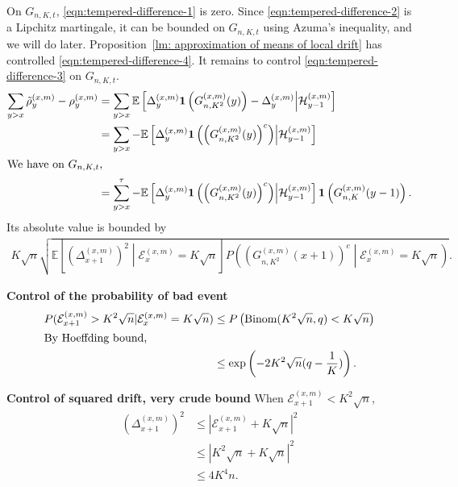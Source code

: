 \documentclass[twoside,12pt,a4paper]{article}
\numberwithin{equation}{section}
\begin{document}
On $G_{n, K, t}$, \eqref{eqn:tempered-difference-1} is zero. Since \eqref{eqn:tempered-difference-2} is a Lipchitz martingale, it can be bounded on $G_{n, K, t}$ using Azuma's inequality, and we will do later. Proposition~\ref{lm: approximation of means of local drift} has controlled \eqref{eqn:tempered-difference-4}. It remains to control \eqref{eqn:tempered-difference-3} on $G_{n, K, t}$. 
	\begin{align*}
		\sum_{y > x} \tilde\rho_y^{(x,m)} - \rho_y^{(x,m)}
		&= \sum_{y > x} \mathbb{E}\left[ \Delta_y^{(x,m)}\mathbf{1}\left( G_{n, K^2}^{(x,m)}(y) \right) - \Delta_{y}^{(x,m)} \middle| \mathcal{H}_{y-1}^{(x,m)}  \right]  \\
		&= \sum_{y > x} -\mathbb{E}\left[ \Delta_y^{(x,m)}\mathbf{1}\left( \left( G_{n, K^2}^{(x,m)}(y) \right) ^c \right) \middle| \mathcal{H}_{y-1}^{(x,m)}  \right]  \\
		\intertext{We have on $G_{n, K, t}$,}
		&= \sum_{y > x}^{\tau} -\mathbb{E}\left[ \Delta_y^{(x,m)}\mathbf{1}\left( \left( G_{n, K^2}^{(x,m)}(y) \right) ^c \right) \middle| \mathcal{H}_{y-1}^{(x,m)}  \right] \mathbf{1}\left(G_{n, K}^{(x,m)}(y-1)\right)
	.\end{align*}
Its absolute value is bounded by
\begin{align*}
	K \sqrt{n} \sqrt{
			\mathbb{E}\left[ (\Delta_{x+1}^{(x,m)})^2 \middle| \mathcal{E}_{x}^{(x,m)} = K \sqrt{n}  \right]
			P\left( \left( G^{(x,m)}_{n, K^2}(x+1) \right) ^{c} \middle| \mathcal{E}_{x}^{(x,m)} = K \sqrt{n}  \right) 
	}
.\end{align*}

\textbf{Control of the probability of bad event}
\begin{align*}
	P(\mathcal{E}_{x+1}^{(x,m)} > K^2 \sqrt{n} | \mathcal{E}_{x}^{(x, m)} = K \sqrt{n})
	&\le P\left( \text{Binom}(K^2 \sqrt{n}, q ) < K \sqrt{n}  \right)  \\
	\intertext{By Hoeffding bound,}
	&\le \exp\left( - 2 K^2 \sqrt{n}(q - \frac{1}{K})  \right) 
.\end{align*}

\textbf{Control of squared drift, very crude bound}
When $\mathcal{E}_{x+1}^{(x,m)} < K^2 \sqrt{n} $,
\begin{align*}
	\left( \Delta_{x+1}^{(x,m)} \right) ^2 
	&\leq \left| \mathcal{E}_{x+1}^{(x,m)} + K \sqrt{n}  \right|^2  \\
	&\leq \left| K^2 \sqrt{n}  + K \sqrt{n}  \right|^2  \\
	&\leq 4 K^4 n
.\end{align*}
\end{document}
